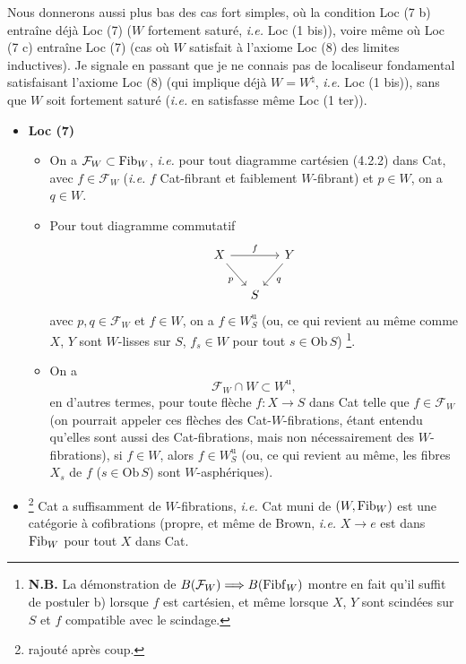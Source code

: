 Nous donnerons aussi plus bas des cas fort simples, où la condition Loc (7 b) entraîne déjà Loc (7) ($W$ fortement saturé, \textit{i.e.} Loc (1 bis)), voire même où Loc (7 c) entraîne Loc (7) (cas où $W$ satisfait à l'axiome Loc (8) des limites inductives). Je signale en passant que je ne connais pas de localiseur fondamental satisfaisant l'axiome Loc (8) (qui implique déjà $W = W^{\natural}$, \textit{i.e.} Loc (1 bis)), sans que $W$ soit fortement saturé (\textit{i.e.} en satisfasse même Loc (1 ter)).

\begin{itemize}[label={},leftmargin=0.6cm]
\item \textbf{Loc (7)}
\begin{itemize}[leftmargin=1.2cm]
\item[a)] On a $\mathcal{F}_W \subset \mathrm{Fib}_W$, \textit{i.e.} pour tout diagramme cartésien (4.2.2) dans Cat, avec $f \in \mathcal{F}_W$ (\textit{i.e.} $f$ Cat-fibrant et faiblement $W$-fibrant) et $p \in W$, on a $q \in W$.
\item[b)] Pour tout diagramme commutatif
\[
\begin{tikzcd}[column sep=small]
X \arrow[rr, "f"] \arrow[dr, "p"'] & & Y \arrow[dl, "q"] \\
 & S &
\end{tikzcd}
\]
avec $p, q \in \mathcal{F}_W$ et $f \in W$, on a $f \in W_S^{\mathrm{u}}$ (ou, ce qui revient au même comme $X$, $Y$ sont $W$-lisses sur $S$, $f_s \in W$ pour tout $s \in \mathrm{Ob}\, S$) \footnote[25]{\textbf{N.B.} La démonstration de $B(\mathcal{F}_W) \Longrightarrow B(\mathrm{Fibf}_W)$ montre en fait qu'il suffit de postuler b) lorsque $f$ est cartésien, et même lorsque $X$, $Y$ sont scindées sur $S$ et $f$ compatible avec le scindage.}.
\item[c)] On a
\[
\mathcal{F}_W \cap W \subset W^{\mathrm{u}},
\]
en d'autres termes, pour toute flèche $f : X \longrightarrow S$ dans Cat telle que $f \in \mathcal{F}_W$ (on pourrait appeler ces flèches des Cat-$W$-fibrations, étant entendu qu'elles sont aussi des Cat-fibrations, mais non nécessairement des $W$-fibrations), si $f \in W$, alors $f \in W_S^{\mathrm{u}}$ (ou, ce qui revient au même, les fibres $X_s$ de $f$ ($s \in \mathrm{Ob}\, S$) sont $W$-asphériques).
\end{itemize}
\end{itemize}


\begin{itemize}[leftmargin=4em]
\item[F)] \footnote[26]{rajouté après coup.} Cat a suffisamment de $W$-fibrations, \textit{i.e.} Cat muni de $(W, \mathrm{Fib}_W)$ est une catégorie à cofibrations (propre, et même de Brown, \textit{i.e.} $X \longrightarrow e$ est dans $\mathrm{Fib}_W$ pour tout $X$ dans Cat. %
\end{itemize}

